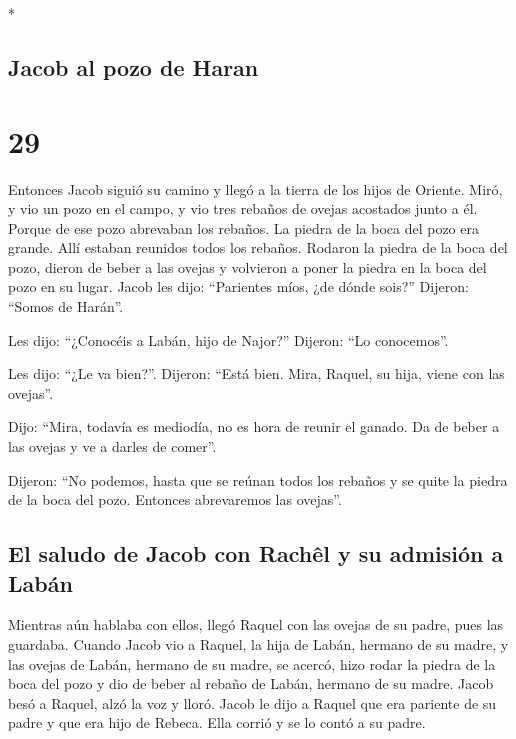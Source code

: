 \begin{paracol}{2}
\switchcolumn[0]*

\hypertarget{jacob-al-pozo-de-haran}{%
\subsection{Jacob al pozo de Haran}\label{jacob-al-pozo-de-haran}}

\hypertarget{section-56}{%
\section{29}\label{section-56}}

 Entonces Jacob siguió su camino y llegó a la tierra de
los hijos de Oriente.  Miró, y vio un pozo en el campo, y
vio tres rebaños de ovejas acostados junto a él. Porque de ese pozo
abrevaban los rebaños. La piedra de la boca del pozo era grande.
 Allí estaban reunidos todos los rebaños. Rodaron la
piedra de la boca del pozo, dieron de beber a las ovejas y volvieron a
poner la piedra en la boca del pozo en su lugar.  Jacob
les dijo: ``Parientes míos, ¿de dónde sois?'' Dijeron: ``Somos de
Harán''.

 Les dijo: ``¿Conocéis a Labán, hijo de Najor?'' Dijeron:
``Lo conocemos''.

 Les dijo: ``¿Le va bien?''. Dijeron: ``Está bien. Mira,
Raquel, su hija, viene con las ovejas''.

 Dijo: ``Mira, todavía es mediodía, no es hora de reunir
el ganado. Da de beber a las ovejas y ve a darles de comer''.

 Dijeron: ``No podemos, hasta que se reúnan todos los
rebaños y se quite la piedra de la boca del pozo. Entonces abrevaremos
las ovejas''.

\hypertarget{el-saludo-de-jacob-con-rachuxeal-y-su-admisiuxf3n-a-labuxe1n}{%
\subsection{El saludo de Jacob con Rachêl y su admisión a
Labán}\label{el-saludo-de-jacob-con-rachuxeal-y-su-admisiuxf3n-a-labuxe1n}}

 Mientras aún hablaba con ellos, llegó Raquel con las
ovejas de su padre, pues las guardaba.  Cuando Jacob vio
a Raquel, la hija de Labán, hermano de su madre, y las ovejas de Labán,
hermano de su madre, se acercó, hizo rodar la piedra de la boca del pozo
y dio de beber al rebaño de Labán, hermano de su madre. 
Jacob besó a Raquel, alzó la voz y lloró.  Jacob le dijo
a Raquel que era pariente de su padre y que era hijo de Rebeca. Ella
corrió y se lo contó a su padre.


\end{paracol}

